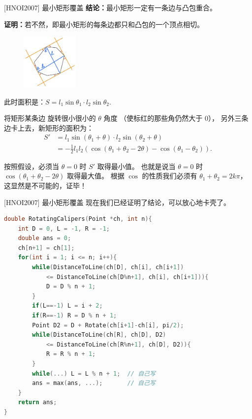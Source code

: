 \documentclass{beamer}
\begin{document}
\begin{frame}{[HNOI2007] 最小矩形覆盖}
    \footnotesize
    \textbf{结论：}最小矩形一定有一条边与凸包重合。

    \pause
    \textbf{证明：}若不然，即最小矩形的每条边都只和凸包的一个顶点相切。
    
    \begin{figure}[H]
        \centering
        \includegraphics[width=0.25\textwidth]{pic/proof.jpg}
    \end{figure}

    \pause 此时面积是：$S=l_1\sin \theta_1\cdot l_2\sin \theta_2$.

    \pause 将矩形某条边
    旋转很小很小的 $\theta$ 角度
    （使标红的那些角仍然大于 $0$），
    另外三条边卡上去，新矩形的面积为：
    \begin{align}
        S' &= l_1\sin(\theta_1+\theta)\cdot l_2\sin(\theta_2+\theta)\\
        &= -\frac{1}{2}l_1l_2 \left(\cos(\theta_1+\theta_2-2\theta)-\cos(\theta_1-\theta_2)\right).
    \end{align}

    \pause 按照假设，必须当 $\theta=0$ 时 $S'$ 取得最小值。
    也就是说当 $\theta=0$ 时 $\cos(\theta_1+\theta_2-2\theta)$ 取得最大值。
    \pause 根据 $\cos$ 的性质我们必须有 $\theta_1+\theta_2=2k\pi$，这显然是不可能的，证毕！
\end{frame}

\begin{frame}[fragile]{[HNOI2007] 最小矩形覆盖}
    \footnotesize
    现在我们已经证明了结论，可以放心地卡壳了。

    \begin{lstlisting}[language=c++]
double RotatingCalipers(Point *ch, int n){
    int D = 0, L = -1, R = -1;
    double ans = 0;
    ch[n+1] = ch[1];
    for(int i = 1; i <= n; i++){
        while(DistanceToLine(ch[D], ch[i], ch[i+1]) 
            <= DistanceToLine(ch[D%n+1], ch[i], ch[i+1])){
            D = D % n + 1;
        }
        if(L==-1) L = i + 2;
        if(R==-1) R = D % n + 1;
        Point D2 = D + Rotate(ch[i+1]-ch[i], pi/2);
        while(DistanceToLine(ch[R], ch[D], D2) 
            <= DistanceToLine(ch[R%n+1], ch[D], D2)){
            R = R % n + 1;
        }
        while(...) L = L % n + 1;  // 自己写
        ans = max(ans, ...);       // 自己写
    }
    return ans;
}
    \end{lstlisting}
\end{frame}
\end{document}
